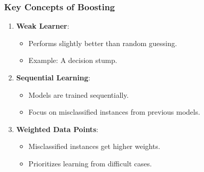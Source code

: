 \documentclass{beamer}
\begin{document}
\begin{frame}[fragile]
    \frametitle{Key Concepts of Boosting}
    \begin{enumerate}
        \item \textbf{Weak Learner}:
        \begin{itemize}
            \item Performs slightly better than random guessing.
            \item Example: A decision stump.
        \end{itemize}
        
        \item \textbf{Sequential Learning}:
        \begin{itemize}
            \item Models are trained sequentially.
            \item Focus on misclassified instances from previous models.
        \end{itemize}
        
        \item \textbf{Weighted Data Points}:
        \begin{itemize}
            \item Misclassified instances get higher weights.
            \item Prioritizes learning from difficult cases.
        \end{itemize}
    \end{enumerate}
\end{frame}
\end{document}
